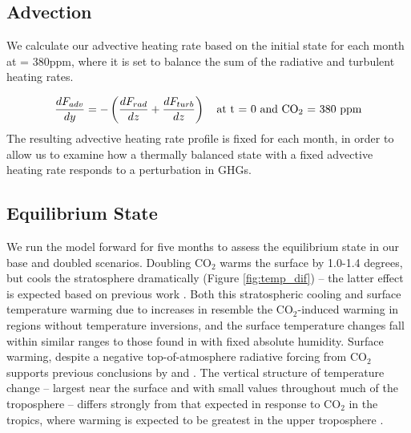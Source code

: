 \documentclass[draft]{agujournal2019}
\begin{document}
\subsection{Advection}
We calculate our advective heating rate based on the initial state for each month at  = 380ppm, where it is set to balance the sum of the radiative and turbulent heating rates.

\begin{equation}
    \frac{dF_{adv}}{dy} = -\left( \frac{dF_{rad}}{dz} + \frac{dF_{turb}}{dz} \right)\quad \text{at t = 0 and \ce{CO_2} = 380 ppm}
\end{equation}
The resulting advective heating rate profile is fixed for each month, in order to allow us to examine how a thermally balanced state with a fixed advective heating rate responds to a perturbation in GHGs. 
\subsection{Equilibrium State}
We run the model forward for five months to assess the equilibrium state in our base and doubled  scenarios. Doubling CO$_2$ warms the surface by 1.0-1.4 degrees, but cools the stratosphere dramatically (Figure \ref{fig:temp_dif})  -- the latter effect is expected based on previous work \cite{manabe_thermal_1967,langematz_thermal_2003}. Both this stratospheric cooling and surface temperature warming due to increases in  resemble the CO$_2$-induced warming in regions without temperature inversions, and the surface temperature changes fall within similar ranges to those found in  with fixed absolute humidity. Surface warming, despite a negative top-of-atmosphere radiative forcing from CO$_2$ supports previous conclusions by  and . The vertical structure of temperature change -- largest near the surface and with small values throughout much of the troposphere -- differs strongly from that expected in response to CO$_2$ in the tropics, where warming is expected to be greatest in the upper troposphere \cite{fu_warming_2011}.
\end{document}
